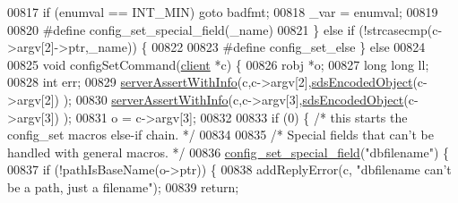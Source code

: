 \begin{DoxyCode}
{{{{{{00817         \textcolor{keywordflow}{if} \textcolor{preprocessor}{(}\textcolor{preprocessor}{enumval} \textcolor{preprocessor}{==} \textcolor{preprocessor}{INT\_MIN}\textcolor{preprocessor}{)} \textcolor{keywordflow}{goto} \textcolor{preprocessor}{badfmt}\textcolor{preprocessor}{;}
00818         \textcolor{preprocessor}{\_var} \textcolor{preprocessor}{=} \textcolor{preprocessor}{enumval}\textcolor{preprocessor}{;}
00819 
00820 \textcolor{preprocessor}{#}\textcolor{preprocessor}{define} \textcolor{preprocessor}{config\_set\_special\_field}\textcolor{preprocessor}{(}\textcolor{preprocessor}{\_name}\textcolor{preprocessor}{)}
00821     \textcolor{preprocessor}{\}} \textcolor{keywordflow}{else} \textcolor{keywordflow}{if} \textcolor{preprocessor}{(}\textcolor{preprocessor}{!}\textcolor{preprocessor}{strcasecmp}\textcolor{preprocessor}{(}\textcolor{preprocessor}{c}\textcolor{preprocessor}{->}\textcolor{preprocessor}{argv}\textcolor{preprocessor}{[}2\textcolor{preprocessor}{]}\textcolor{preprocessor}{->}\textcolor{preprocessor}{ptr}\textcolor{preprocessor}{,}\textcolor{preprocessor}{\_name}\textcolor{preprocessor}{)}\textcolor{preprocessor}{)} \textcolor{preprocessor}{\{}
00822 
00823 \textcolor{preprocessor}{#}\textcolor{preprocessor}{define} \textcolor{preprocessor}{config\_set\_else} \textcolor{preprocessor}{\}} \textcolor{keywordflow}{else}
00824 
00825 \textcolor{keywordtype}{void} configSetCommand(\hyperlink{structclient}{client} *c) \{
00826     robj *o;
00827     \textcolor{keywordtype}{long} \textcolor{keywordtype}{long} ll;
00828     \textcolor{keywordtype}{int} err;
00829     \hyperlink{server_8h_a7308f76cbff9a8d3797fe78190b91282}{serverAssertWithInfo}(c,c->argv[2],\hyperlink{server_8h_afcfb5bd97af52d1dbce331745cae030c}{sdsEncodedObject}(c->argv[2])
      );
00830     \hyperlink{server_8h_a7308f76cbff9a8d3797fe78190b91282}{serverAssertWithInfo}(c,c->argv[3],\hyperlink{server_8h_afcfb5bd97af52d1dbce331745cae030c}{sdsEncodedObject}(c->argv[3])
      );
00831     o = c->argv[3];
00832 
00833     \textcolor{keywordflow}{if} (0) \{ \textcolor{comment}{/* this starts the config\_set macros else-if chain. */}
00834 
00835     \textcolor{comment}{/* Special fields that can't be handled with general macros. */}
00836     \hyperlink{config_8c_a7bdda941057dd2668e0e5b5df1d3ab4c}{config\_set\_special\_field}(\textcolor{stringliteral}{"dbfilename"}) \{
00837         \textcolor{keywordflow}{if} (!pathIsBaseName(o->ptr)) \{
00838             addReplyError(c, \textcolor{stringliteral}{"dbfilename can't be a path, just a filename"});
00839             \textcolor{keywordflow}{return};
}}}}}}
\end{DoxyCode}
